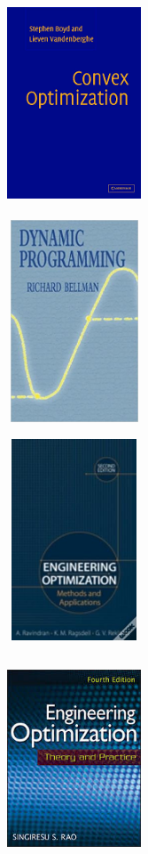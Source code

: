 \documentclass{beamer}
\begin{document}
\begin{frame}
{
	\begin{figure}[!htb]
		\includegraphics[width=4cm, height=6cm]{convexoptmization.png}
	\end{figure}
}

{
	\begin{figure}[!htb]
		\includegraphics[width=4cm, height=6cm]{dynamicprogramming-belmann.jpg}
	\end{figure}
}

{
	\begin{figure}[!htb]
		\includegraphics[width=4cm, height=6cm]{engineeringoptimization.jpg}
	\end{figure}
}
{
	\begin{figure}[!htb]
		\includegraphics[width=4cm, height=6cm]{engineeringoptmizationrao.jpg}
	\end{figure}
}


\end{frame}
\end{document}
